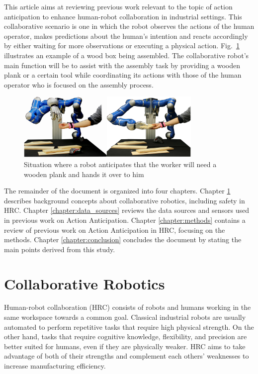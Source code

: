 \documentclass[conference]{IEEEtran}
\begin{document}
This article aims at reviewing previous work relevant to the topic of action anticipation to enhance human-robot collaboration in industrial settings. This collaborative scenario is one in which the robot observes the actions of the human operator, makes predictions about the human’s intention and reacts accordingly by either waiting for more observations or executing a physical action. Fig.~\ref{example} illustrates an example of a wood box being assembled. The collaborative robot’s main function will be to assist with the assembly task by providing a wooden plank or a certain tool while coordinating its actions with those of the human operator who is focused on the assembly process.

\begin{figure}[htbp]
\centerline{\includegraphics[width=3.5in]{figs/example.PNG}}
\caption{Situation where a robot anticipates that the worker will need a wooden plank and hands it over to him \cite{Maeda2016}}
\label{example}
\end{figure}

The remainder of the document is organized into four chapters. Chapter \ref{chapter:collaborative_robotics} describes background concepts about collaborative robotics, including safety in HRC. Chapter \ref{chapter:data_sources} reviews the data sources and sensors used in previous work on Action Anticipation. Chapter \ref{chapter:methods} contains a review of previous work on Action Anticipation in HRC, focusing on the methods. Chapter \ref{chapter:conclusion} concludes the document by stating the main points derived from this study.

\section{Collaborative Robotics}
\label{chapter:collaborative_robotics}

Human-robot collaboration (HRC) consists of robots and humans working in the same workspace towards a common goal. Classical industrial robots are usually automated to perform repetitive tasks that require high physical strength. On the other hand, tasks that require cognitive knowledge, flexibility, and precision are better suited for humans, even if they are physically weaker. HRC aims to take advantage of both of their strengths and complement each others’ weaknesses to increase manufacturing efficiency.
\end{document}
